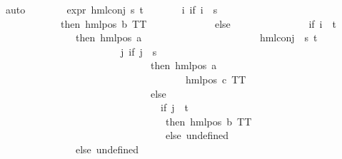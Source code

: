 \begin{isabellebody}
\ auto\isanewline
\isanewline
\ \ \ \ \ \ \isamarkupfalse%
\ {\isachardoublequoteopen}expr{\isacharunderscore}{\kern0pt}{}\ {\isacharparenleft}{\kern0pt}hml{\isacharunderscore}{\kern0pt}conj\ {\isacharbraceleft}{\kern0pt}s{\isacharcomma}{\kern0pt}\ t{\isacharbraceright}{\kern0pt}\ {\isacharbraceleft}{\kern0pt}{\isacharbraceright}{\kern0pt}\isanewline
\ \ \ \ \ \ {\isacharparenleft}{\kern0pt}{\isasymlambda}i{\isachardot}{\kern0pt}\ {\isacharparenleft}{\kern0pt}if\ i\ {\isacharequal}{\kern0pt}\ s\ \isanewline
\ \ \ \ \ \ \ \ \ \ \ \ then\ {\isacharparenleft}{\kern0pt}hml{\isacharunderscore}{\kern0pt}pos\ b\ TT{\isacharparenright}{\kern0pt}\ \isanewline
\ \ \ \ \ \ \ \ \ \ \ \ else\ \isanewline
\ \ \ \ \ \ \ \ \ \ \ \ \ \ {\isacharparenleft}{\kern0pt}if\ i\ {\isacharequal}{\kern0pt}\ t\ \ \isanewline
\ \ \ \ \ \ \ \ \ \ \ \ \ \ \ then\ {\isacharparenleft}{\kern0pt}hml{\isacharunderscore}{\kern0pt}pos\ a\ \isanewline
\ \ \ \ \ \ \ \ \ \ \ \ \ \ \ \ \ \ \ \ \ \ {\isacharparenleft}{\kern0pt}hml{\isacharunderscore}{\kern0pt}conj\ {\isacharbraceleft}{\kern0pt}{\isacharbraceright}{\kern0pt}\ {\isacharbraceleft}{\kern0pt}s{\isacharcomma}{\kern0pt}\ t{\isacharbraceright}{\kern0pt}\ \isanewline
\ \ \ \ \ \ \ \ \ \ \ \ \ \ \ \ \ \ \ \ \ \ \ \ {\isacharparenleft}{\kern0pt}{\isasymlambda}j{\isachardot}{\kern0pt}\ {\isacharparenleft}{\kern0pt}if\ j\ {\isacharequal}{\kern0pt}\ s\ \isanewline
\ \ \ \ \ \ \ \ \ \ \ \ \ \ \ \ \ \ \ \ \ \ \ \ \ \ \ \ \ \ then\ {\isacharparenleft}{\kern0pt}hml{\isacharunderscore}{\kern0pt}pos\ a\ \isanewline
\ \ \ \ \ \ \ \ \ \ \ \ \ \ \ \ \ \ \ \ \ \ \ \ \ \ \ \ \ \ \ \ \ \ \ \ \ {\isacharparenleft}{\kern0pt}hml{\isacharunderscore}{\kern0pt}pos\ c\ TT{\isacharparenright}{\kern0pt}{\isacharparenright}{\kern0pt}\ \isanewline
\ \ \ \ \ \ \ \ \ \ \ \ \ \ \ \ \ \ \ \ \ \ \ \ \ \ \ \ \ \ else\ \isanewline
\ \ \ \ \ \ \ \ \ \ \ \ \ \ \ \ \ \ \ \ \ \ \ \ \ \ \ \ \ \ \ \ {\isacharparenleft}{\kern0pt}if\ j\ {\isacharequal}{\kern0pt}\ t\ \isanewline
\ \ \ \ \ \ \ \ \ \ \ \ \ \ \ \ \ \ \ \ \ \ \ \ \ \ \ \ \ \ \ \ \ then\ {\isacharparenleft}{\kern0pt}hml{\isacharunderscore}{\kern0pt}pos\ b\ TT{\isacharparenright}{\kern0pt}\ \isanewline
\ \ \ \ \ \ \ \ \ \ \ \ \ \ \ \ \ \ \ \ \ \ \ \ \ \ \ \ \ \ \ \ \ else\ undefined{\isacharparenright}{\kern0pt}{\isacharparenright}{\kern0pt}{\isacharparenright}{\kern0pt}{\isacharparenright}{\kern0pt}{\isacharparenright}{\kern0pt}\isanewline
\ \ \ \ \ \ \ \ \ \ \ \ \ \ \ else\ undefined{\isacharparenright}{\kern0pt}{\isacharparenright}{\kern0pt}{\isacharparenright}{\kern0pt}{\isacharparenright}{\kern0pt}\ {\isacharequal}{\kern0pt}\ {}{\isachardoublequoteclose}\isanewline

\end{isabellebody}
